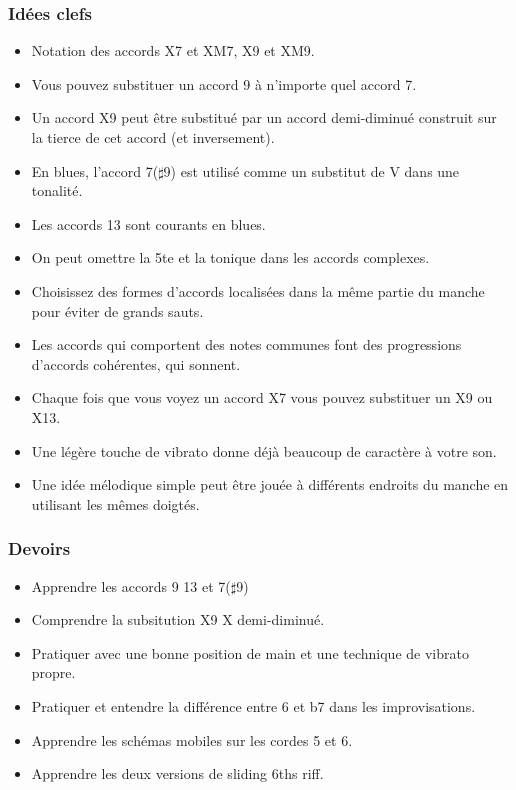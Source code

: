 \documentclass[a4paper]{book}
\begin{document}
\subsubsection{Idées clefs}
\begin{itemize}
\item Notation des accords X7 et XM7, X9 et XM9.
\item Vous pouvez substituer un accord 9 à n'importe quel accord 7.
\item Un accord X9 peut être substitué par un accord demi-diminué construit sur la tierce de cet accord (et inversement).
\item En blues, l'accord 7($\sharp$9) est utilisé comme un substitut de V dans une tonalité.
\item Les accords 13 sont courants en blues.
\item On peut omettre la 5te et la tonique dans les accords complexes.
\item Choisissez des formes d'accords localisées dans la même partie du manche pour éviter de grands sauts.
\item Les accords qui comportent des notes communes font des progressions d'accords cohérentes, qui sonnent.
\item Chaque fois que vous voyez un accord X7 vous pouvez substituer un X9 ou X13.
\item Une légère touche de vibrato donne déjà beaucoup de caractère à votre son.
\item Une idée mélodique simple peut être jouée à différents endroits du manche en utilisant les mêmes doigtés.
\end{itemize}

\subsubsection{Devoirs}
\begin{itemize}
\item Apprendre les accords 9 13 et 7($\sharp$9)
\item Comprendre la subsitution X9 X demi-diminué.
\item Pratiquer avec une bonne position de main et une technique de vibrato propre.
\item Pratiquer et entendre la différence entre 6 et b7 dans les improvisations.
\item Apprendre les schémas mobiles sur les cordes 5 et 6.
\item Apprendre les deux versions de sliding 6ths riff.
\end{itemize}
\end{document}
